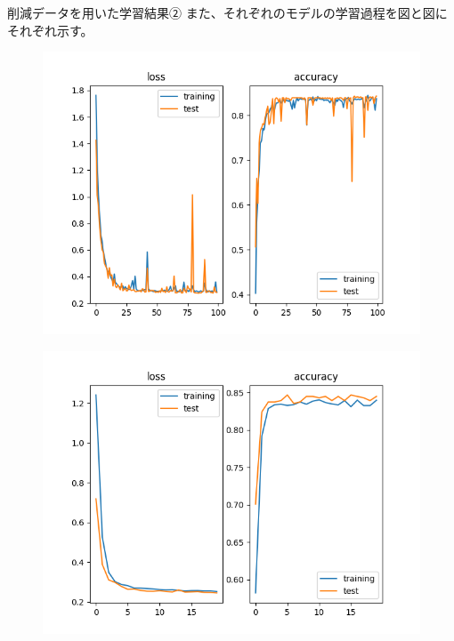 \documentclass[dvipdfmx]{beamer}
\begin{document}
  \begin{frame}{削減データを用いた学習結果②}
    また、それぞれのモデルの学習過程を図と図にそれぞれ示す。
    \begin{figure}
      \begin{minipage}[b]{0.45\linewidth}
        \centering
        \includegraphics[keepaspectratio, scale=0.3]{images/less_train_fnn.png}
        \label{fig:Simple_FNN}
      \end{minipage}
      \begin{minipage}[b]{0.45\linewidth}
        \centering
        \includegraphics[keepaspectratio, scale=0.3]{images/less_train_cnn.png}
        \label{fig:Simple_CNN}
      \end{minipage}
    \end{figure}    
  \end{frame}
\end{document}
